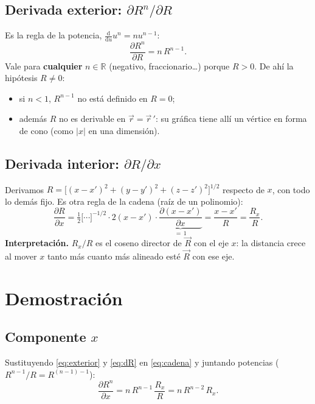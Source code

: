 \documentclass[11pt,a4paper]{article}
\numberwithin{equation}{section}
\newcommand{\vc}[1]{\vec{#1}}
\newcommand{\pd}[2]{\frac{\partial #1}{\partial #2}}
\begin{document}
\subsection{Derivada exterior: $\partial R^{n}/\partial R$}
Es la regla de la potencia, $\frac{\mathrm d}{\mathrm du}u^{n}=nu^{n-1}$:
\begin{equation}\label{eq:exterior}
  \pd{R^{n}}{R}=n\,R^{n-1}.
\end{equation}
Vale para \textbf{cualquier} $n\in\mathbb{R}$ (negativo, fraccionario\dots)
porque $R>0$. De ahí la hipótesis $R\neq0$:
\begin{itemize}
  \item si $n<1$, $R^{n-1}$ no está definido en $R=0$;
  \item además $R$ no es derivable en $\vc{r}=\vc{r}\,'$: su gráfica tiene allí
        un vértice en forma de cono (como $|x|$ en una dimensión).
\end{itemize}

\subsection{Derivada interior: $\partial R/\partial x$}
Derivamos $R=\bigl[(x-x')^{2}+(y-y')^{2}+(z-z')^{2}\bigr]^{1/2}$ respecto de
$x$, con todo lo demás fijo. Es otra regla de la cadena (raíz de un polinomio):
\begin{equation}\label{eq:dR}
  \pd{R}{x}
  =\tfrac12\bigl[\cdots\bigr]^{-1/2}\cdot 2(x-x')\cdot\underbrace{\pd{(x-x')}{x}}_{=\,1}
  =\frac{x-x'}{R}=\frac{R_x}{R}.
\end{equation}
\textbf{Interpretación.} $R_x/R$ es el coseno director de $\vc{R}$ con el eje
$x$: la distancia crece al mover $x$ tanto más cuanto más alineado esté
$\vc{R}$ con ese eje.

\section{Demostración}
\subsection{Componente $x$}
Sustituyendo \eqref{eq:exterior} y \eqref{eq:dR} en \eqref{eq:cadena} y
juntando potencias ($R^{n-1}/R=R^{(n-1)-1}$):
\begin{equation}\label{eq:compx}
  \pd{R^{n}}{x}=n\,R^{n-1}\,\frac{R_x}{R}=n\,R^{n-2}\,R_x .
\end{equation}
\end{document}
